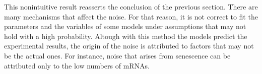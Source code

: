 This nonintuitive result reasserts the conclusion of the previous section. There are many mechanisms that affect the noise. For that reason, it is not correct to fit the parameters and the variables of some models under assumptions that may not hold with a high probability. Altough with this method the models predict the experimental results, the origin of the noise is attributed to factors that may not be the actual ones. For instance, noise that arises from senescence can be attributed only to the low numbers of mRNAs.

